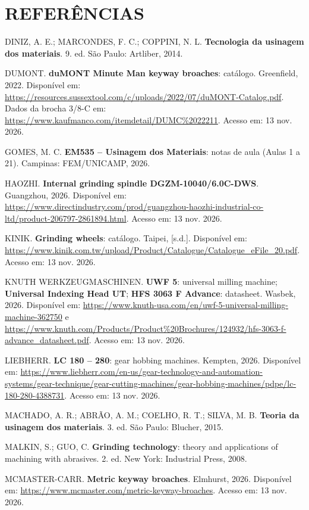 \chapter*{REFERÊNCIAS}

\noindent DINIZ, A. E.; MARCONDES, F. C.; COPPINI, N. L. \textbf{Tecnologia da usinagem dos materiais}. 9. ed. São Paulo: Artliber, 2014.

\noindent DUMONT. \textbf{duMONT Minute Man keyway broaches}: catálogo. Greenfield, 2022. Disponível em: \url{https://resources.sussextool.com/c/uploads/2022/07/duMONT-Catalog.pdf}. Dados da brocha 3/8-C em: \url{https://www.kaufmanco.com/itemdetail/DUMC%2022211}. Acesso em: 13 nov. 2026.

\noindent GOMES, M. C. \textbf{EM535 – Usinagem dos Materiais}: notas de aula (Aulas 1 a 21). Campinas: FEM/UNICAMP, 2026.

\noindent HAOZHI. \textbf{Internal grinding spindle DGZM-10040/6.0C-DWS}. Guangzhou, 2026. Disponível em: \url{https://www.directindustry.com/prod/guangzhou-haozhi-industrial-co-ltd/product-206797-2861894.html}. Acesso em: 13 nov. 2026.

\noindent KINIK. \textbf{Grinding wheels}: catálogo. Taipei, [s.d.]. Disponível em: \url{https://www.kinik.com.tw/upload/Product/Catalogue/Catalogue_eFile_20.pdf}. Acesso em: 13 nov. 2026.

\noindent KNUTH WERKZEUGMASCHINEN. \textbf{UWF 5}: universal milling machine; \textbf{Universal Indexing Head UT}; \textbf{HFS 3063 F Advance}: datasheet. Wasbek, 2026. Disponível em: \url{https://www.knuth-usa.com/en/uwf-5-universal-milling-machine-362750} e \url{https://www.knuth.com/Products/Product%20Brochures/124932/hfs-3063-f-advance_datasheet.pdf}. Acesso em: 13 nov. 2026.

\noindent LIEBHERR. \textbf{LC 180 – 280}: gear hobbing machines. Kempten, 2026. Disponível em: \url{https://www.liebherr.com/en-us/gear-technology-and-automation-systems/gear-technique/gear-cutting-machines/gear-hobbing-machines/pdpe/lc-180-280-4388731}. Acesso em: 13 nov. 2026.

\noindent MACHADO, A. R.; ABRÃO, A. M.; COELHO, R. T.; SILVA, M. B. \textbf{Teoria da usinagem dos materiais}. 3. ed. São Paulo: Blucher, 2015.

\noindent MALKIN, S.; GUO, C. \textbf{Grinding technology}: theory and applications of machining with abrasives. 2. ed. New York: Industrial Press, 2008.

\noindent MCMASTER-CARR. \textbf{Metric keyway broaches}. Elmhurst, 2026. Disponível em: \url{https://www.mcmaster.com/metric-keyway-broaches}. Acesso em: 13 nov. 2026.

